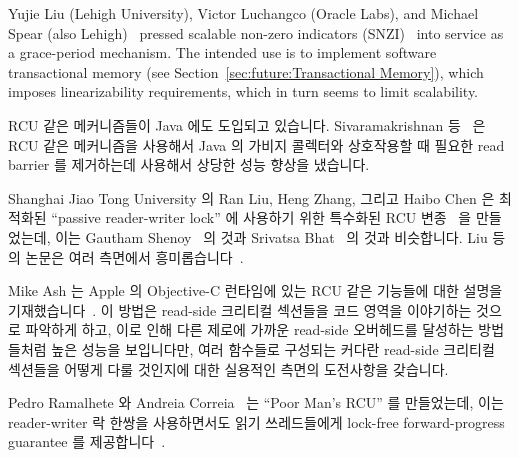 Yujie Liu (Lehigh University), Victor Luchangco (Oracle Labs), and
Michael Spear (also Lehigh)~\cite{Liu:2013:MSA:2549695.2549732}
pressed scalable non-zero indicators
(SNZI)~\cite{FaithEllen:2007:SNZI} into service as a grace-period
mechanism.
The intended use is to implement software transactional memory
(see Section~\ref{sec:future:Transactional Memory}), which
imposes linearizability requirements, which in turn seems to
limit scalability.
\fi

RCU 같은 메커니즘들이 Java 에도 도입되고 있습니다.
Sivaramakrishnan 등~\cite{Sivaramakrishnan:2012:ERB:2258996.2259005} 은 RCU
같은 메커니즘을 사용해서 Java 의 가비지 콜렉터와 상호작용할 때 필요한 read
barrier 를 제거하는데 사용해서 상당한 성능 향상을 냈습니다.

Shanghai Jiao Tong University 의 Ran Liu, Heng Zhang, 그리고 Haibo Chen 은
최적화된 ``passive reader-writer lock'' 에 사용하기 위한 특수화된 RCU
변종~\cite{RanLiu2014PassiveRWLock} 을 만들었는데, 이는 Gautham
Shenoy~\cite{GauthamShenoy2006RCUrwlock} 의 것과 Srivatsa
Bhat~\cite{SrivatsaSBhat2014RCUrwlock} 의 것과 비슷합니다.
Liu 등의 논문은 여러 측면에서 흥미롭습니다~\cite{PaulEMcKenney2014ReadMostly}.
\iffalse

RCU-like mechanisms are also finding their way into Java.
Sivaramakrishnan et al.~\cite{Sivaramakrishnan:2012:ERB:2258996.2259005}
use an RCU-like mechanism to eliminate the read barriers that are
otherwise required when interacting with Java's garbage collector,
resulting in significant performance improvements.

Ran Liu, Heng Zhang, and Haibo Chen of Shanghai Jiao Tong University
created a specialized variant of RCU that they used for an optimized
``passive reader-writer lock''~\cite{RanLiu2014PassiveRWLock}, similar to
those created by Gautham Shenoy~\cite{GauthamShenoy2006RCUrwlock} and
Srivatsa Bhat~\cite{SrivatsaSBhat2014RCUrwlock}.
The Liu et al.~paper is interesting from a number of
perspectives~\cite{PaulEMcKenney2014ReadMostly}.
\fi

Mike Ash 는 Apple 의 Objective-C 런타임에 있는 RCU 같은 기능들에 대한 설명을
기재했습니다~\cite{MikeAsh2015Apple}.
이 방법은 read-side 크리티컬 섹션들을 코드 영역을 이야기하는 것으로 파악하게
하고, 이로 인해 다른 제로에 가까운 read-side 오버헤드를 달성하는 방법들처럼
높은 성능을 보입니다만, 여러 함수들로 구성되는 커다란 read-side 크리티컬
섹션들을 어떻게 다룰 것인지에 대한 실용적인 측면의 도전사항을 갖습니다.

Pedro Ramalhete 와 Andreia Correia~\cite{PedroRmalhete2015PoorMansRCU} 는
``Poor Man's RCU'' 를 만들었는데, 이는 reader-writer 락 한쌍을 사용하면서도
읽기 쓰레드들에게 lock-free forward-progress guarantee 를
제공합니다~\cite{PaulEMcKenney2015ReadMostly}.

